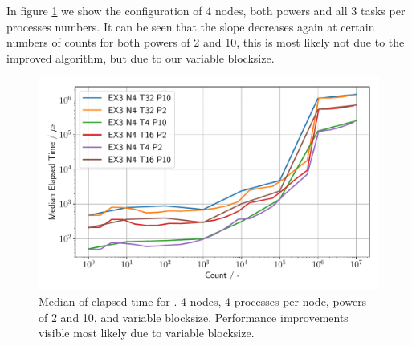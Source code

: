 In figure \ref{Ex3_2_p} we show the configuration of 4 nodes, both powers and all 3 tasks per processes numbers.
It can be seen that the slope decreases again at certain numbers of counts for both powers of 2 and 10, 
this is most likely not due to the improved algorithm, but due to our variable blocksize.

\begin{figure}[h]

    \begin{center}
        \includegraphics[width=1\linewidth]{figures/Ex3_2.pdf}
        \caption{Median of elapsed time for . 4 nodes, 4 processes per node, 
        powers of 2 and 10, and variable blocksize. Performance improvements visible most likely
        due to variable blocksize.}
        \label{Ex3_2_p}
    \end{center}
\end{figure}